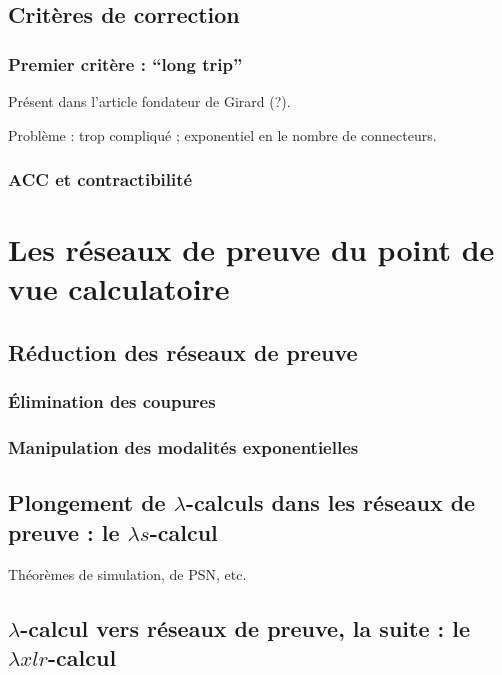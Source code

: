 \documentclass[a4paper, 11pt]{article}
\begin{document}
\subsection{Critères de correction}

\subsubsection{Premier critère : \enquote{long trip}}

Présent dans l'article fondateur de Girard (?).

Problème : trop compliqué ; exponentiel en le nombre de connecteurs.

\subsubsection{ACC et contractibilité}



\section{Les réseaux de preuve du point de vue calculatoire}

\subsection{Réduction des réseaux de preuve}

\subsubsection{\'Elimination des coupures}

\subsubsection{Manipulation des modalités exponentielles}

\subsection{Plongement de $\lambda$-calculs dans les réseaux de preuve : le $\lambda s$-calcul}

Théorèmes de simulation, de PSN, etc. 

\subsection{$\lambda$-calcul vers réseaux de preuve, la suite : le $\lambda x l r$-calcul}
\end{document}
